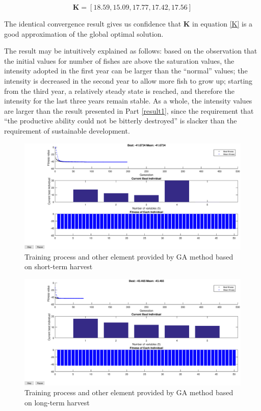 \documentclass{IEEEtran}
\begin{document}
\begin{equation}\label{K}\boldsymbol{K} = [18.59, 15.09, 17.77, 17.42, 17.56]\end{equation}
    
The identical convergence result gives us confidence that $\boldsymbol{K}$ in equation \ref{K} is a good approximation of the global optimal solution.

The result may be intuitively explained as follows: based on the observation that the initial values for number of fishes are above the saturation values, the intensity adopted in the first year can be larger than the ``normal'' values; the intensity is decreased in the second year to allow more fish to grow up; starting from the third year, a relatively steady state is reached, and therefore the intensity for the last three years remain stable. As a whole, the intensity values are larger than the result presented in Part \ref{result1}, since the requirement that ``the productive ability could not be bitterly destroyed'' is slacker than the requirement of sustainable development.

\begin{figure}[h]
    \includegraphics[width=\columnwidth]{1GA.eps}
    \caption{Training process and other element provided by GA method based on short-term harvest}
    \label{fig1}
\end{figure}
\begin{figure}[h]
    \includegraphics[width=\columnwidth]{2GA.eps}
    \caption{Training process and other element provided by GA method based on long-term harvest}
    \label{fig2}
\end{figure}
\end{document}
